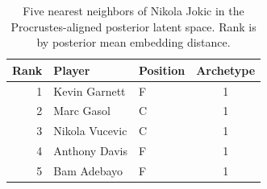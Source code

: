 \begin{table}[htbp]
  \centering\small
  \begin{tabular}{rllc}
    \toprule
    Rank & Player & Position & Archetype \\
    \midrule
    1 & Kevin Garnett & F & 1 \\
    2 & Marc Gasol & C & 1 \\
    3 & Nikola Vucevic & C & 1 \\
    4 & Anthony Davis & F & 1 \\
    5 & Bam Adebayo & F & 1 \\
    \bottomrule
  \end{tabular}
  \caption{Five nearest neighbors of Nikola Jokic in the Procrustes-aligned posterior latent space. Rank is by posterior mean embedding distance.}
  \label{tab:Nikola_Jokic_neighbors}
\end{table}

